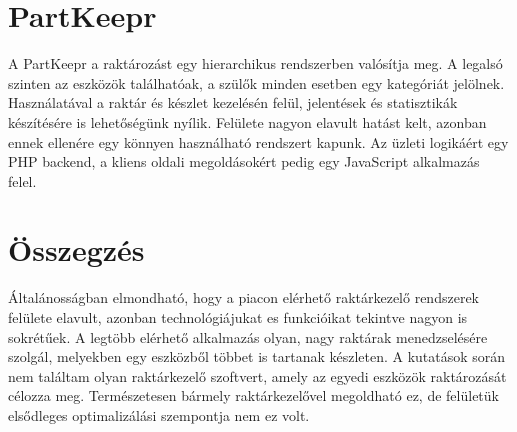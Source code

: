 \section{PartKeepr}
A PartKeepr a raktározást egy hierarchikus rendszerben valósítja meg. A legalsó szinten az eszközök találhatóak, a szülők minden esetben egy kategóriát jelölnek. Használatával a raktár és készlet kezelésén felül, jelentések és statisztikák készítésére is lehetőségünk nyílik. Felülete nagyon elavult hatást kelt, azonban ennek ellenére egy könnyen használható rendszert kapunk.\cite{PartKeepr}
Az üzleti logikáért egy PHP backend, a kliens oldali megoldásokért pedig egy JavaScript alkalmazás felel.\cite{PartKeeprGithub}



\section{Összegzés}
Általánosságban elmondható, hogy a piacon elérhető raktárkezelő rendszerek felülete elavult, azonban technológiájukat es funkcióikat tekintve nagyon is sokrétűek. A legtöbb elérhető alkalmazás olyan, nagy raktárak menedzselésére szolgál, melyekben egy eszközből többet is tartanak készleten. A kutatások során nem találtam olyan raktárkezelő szoftvert, amely az egyedi eszközök raktározását célozza meg. Természetesen bármely raktárkezelővel megoldható ez, de felületük elsődleges optimalizálási szempontja nem ez volt.
